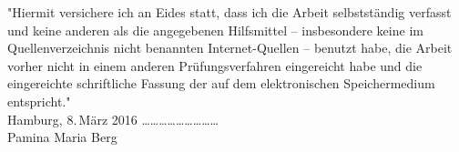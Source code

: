 \documentclass[paper=a4, DIV=13, BCOR=12mm, twoside=on, onecolumn=on, open = any, titlepage =on, parskip =half-, headsepline = on, footsepline = on, chapterprefix = on, sectionprefix = on, appendixprefix = off, fontsize = 11pt, numbers = noenddot, abstract = off]{scrreprt}
\begin{document}
\newpage

\newpage



\cleardoublepage
\newpage
\thispagestyle{empty}
\vspace*{\fill}
"Hiermit versichere ich an Eides statt, dass ich die Arbeit selbstständig verfasst und keine anderen als die angegebenen Hilfsmittel – insbesondere keine im Quellenverzeichnis nicht benannten Internet-Quellen – benutzt habe, die Arbeit vorher nicht in einem anderen Prüfungsverfahren eingereicht habe und die eingereichte schriftliche Fassung der auf dem elektronischen Speichermedium entspricht."\\

Hamburg, 8.\,März 2016 \hspace*{\fill} \dots \dots \dots \dots \dots \dots \dots \dots \dots\\
\hspace*{\fill} Pamina Maria Berg \quad $\,$
\end{document}
